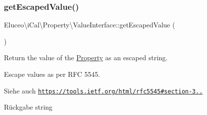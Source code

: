 \subsubsection{\texorpdfstring{get\+Escaped\+Value()}{getEscapedValue()}\hspace{0.1cm}{\footnotesize\ttfamily [3/3]}}
{\footnotesize\ttfamily Eluceo\textbackslash{}i\+Cal\textbackslash{}\+Property\textbackslash{}\+Value\+Interface\+::get\+Escaped\+Value (\begin{DoxyParamCaption}{ }\end{DoxyParamCaption})}

Return the value of the \mbox{\hyperlink{class_eluceo_1_1i_cal_1_1_property}{Property}} as an escaped string.

Escape values as per R\+FC 5545.

\begin{DoxySeeAlso}{Siehe auch}
\href{https://tools.ietf.org/html/rfc5545#section-3.3.11}{\tt https\+://tools.\+ietf.\+org/html/rfc5545\#section-\/3..}
\end{DoxySeeAlso}
\begin{DoxyReturn}{Rückgabe}
string 
\end{DoxyReturn}


